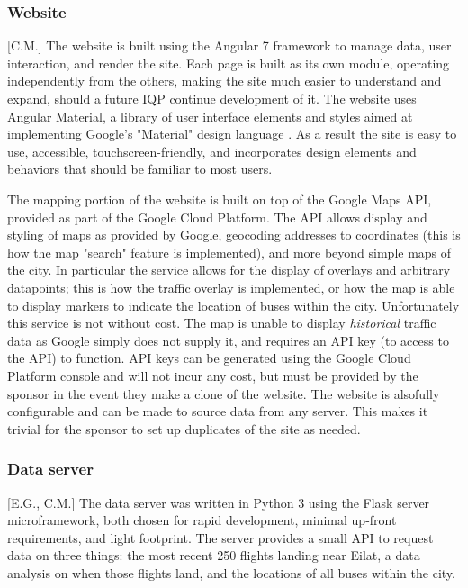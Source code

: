 \documentclass[12pt]{article}                       %
\begin{document}
\subsubsection{Website}[C.M.]
The website is built using the Angular 7 framework to manage data, user interaction, and render the site. Each page is built as its own module, operating independently from the others, making the site much easier to understand and expand, should a future IQP continue development of it. The website uses Angular Material, a library of user interface elements and styles aimed at implementing Google's "Material" design language \cite{2019AngularMaterial}. As a result the site is easy to use, accessible, touchscreen-friendly, and incorporates design elements and behaviors that should be familiar to most users.

The mapping portion of the website is built on top of the Google Maps API, provided as part of the Google Cloud Platform. The API allows display and styling of maps as provided by Google, geocoding addresses to coordinates (this is how the map "search" feature is implemented), and more beyond simple maps of the city. In particular the service allows for the display of overlays and arbitrary datapoints; this is how the traffic overlay is implemented, or how the map is able to display markers to indicate the location of buses within the city. Unfortunately this service is not without cost. The map is unable to display \textit{historical} traffic data as Google simply does not supply it, and requires an API key (to access to the API) to function. API keys can be generated using the Google Cloud Platform console and will not incur any cost, but must be provided by the sponsor in the event they make a clone of the website. The website is alsofully configurable and can be made to source data from any server. This makes it trivial for the sponsor to set up duplicates of the site as needed.

\subsubsection{Data server}[E.G., C.M.]
The data server was written in Python 3 using the Flask server microframework, both chosen for rapid development, minimal up-front requirements, and light footprint. The server provides a small API to request data on three things: the most recent 250 flights landing near Eilat, a data analysis on when those flights land, and the locations of all buses within the city.
\end{document}
